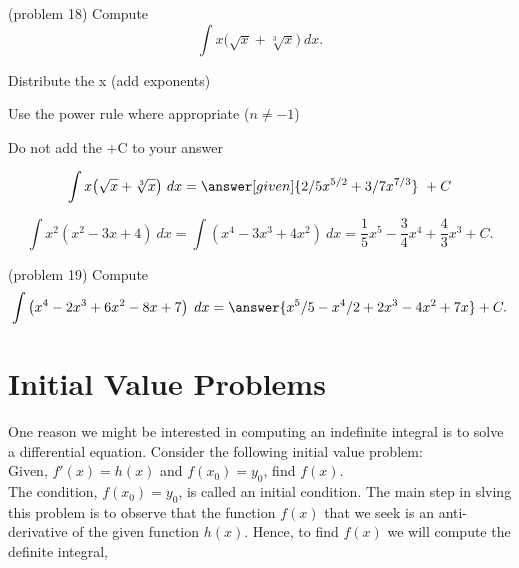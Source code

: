 \documentclass{ximera}
\begin{document}
\begin{problem}(problem 18)
Compute
\[
\int x\big(\sqrt x + \sqrt[3] x \big) \ dx.
\]

\begin{hint}
Distribute the x (add exponents)
\end{hint}
\begin{hint}
Use the power rule where appropriate ($n\neq -1$)
\end{hint}
\begin{hint}
\begin{center}
Do not add the +C to your answer
\end{center}
\end{hint}

\[
\int  x\big(\sqrt x + \sqrt[3] x \big) \ dx =
\answer[given]{2/5 x^{5/2} + 3/7 x^{7/3}} \ +  C
\]
\end{problem}


\begin{example}[example 19]
\[
\int x^2(x^2 - 3x + 4) \ dx = \int (x^4 - 3x^3 + 4x^2) \ dx = \frac15 x^5 - \frac{3}{4}x^4 + \frac43 x^3 + C.
\]

\end{example}

\begin{problem}(problem 19)
Compute
\[
\int \left(x^4 - 2x^3 + 6x^2 - 8x + 7 \right) \; dx = \answer{ x^5/5 - x^4/2 + 2x^3 - 4x^2 + 7x} + C.
\]
\end{problem}





\section{Initial Value Problems}


One reason we might be interested in computing an indefinite integral is to solve a differential equation. Consider the following initial value problem:\\
Given, $f'(x) = h(x)$ and $f(x_0) = y_0$, find $f(x)$.\\
The condition, $f(x_0) = y_0$, is called an initial condition. The main step in slving this problem is to observe that the function $f(x)$ that we seek is an anti-derivative of the given function $h(x)$. Hence, to find $f(x)$ we will compute the definite integral, 
\end{document}
